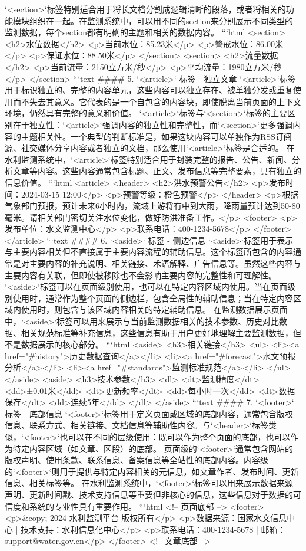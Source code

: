 `<section>`标签特别适合用于将长文档分割成逻辑清晰的段落，或者将相关的功能模块组织在一起。在监测系统中，可以用不同的section来分别展示不同类型的监测数据，每个section都有明确的主题和相关的数据内容。 ```html <section> <h2>水位数据</h2> <p>当前水位：85.23米</p> <p>警戒水位：86.00米</p> <p>保证水位：88.50米</p> </section> <section> <h2>流量数据</h2> <p>当前流量：2150立方米/秒</p> <p>平均流量：1980立方米/秒</p> </section> ```text #### 5. `<article>` 标签 - 独立文章 `<article>`标签用于标识独立的、完整的内容单元，这些内容可以独立存在、被单独分发或重复使用而不失去其意义。它代表的是一个自包含的内容块，即使脱离当前页面的上下文环境，仍然具有完整的意义和价值。 `<article>`标签与`<section>`标签的主要区别在于独立性：`<article>`强调内容的独立性和完整性，而`<section>`更多强调内容的主题相关性。一个典型的判断标准是，如果这块内容可以单独作为RSS订阅源、社交媒体分享内容或者独立的文档，那么使用`<article>`标签是合适的。 在水利监测系统中，`<article>`标签特别适合用于封装完整的报告、公告、新闻、分析文章等内容。这些内容通常包含标题、正文、发布信息等完整要素，具有独立的信息价值。 ```html <article> <header> <h2>洪水预警公告</h2> <p>发布时间：2024-03-15 12:00</p> <p>预警等级：橙色预警</p> </header> <p>根据气象部门预报，预计未来6小时内，流域上游将有中到大雨，降雨量预计达到50-80毫米。请相关部门密切关注水位变化，做好防洪准备工作。</p> <footer> <p>发布单位：水文监测中心</p> <p>联系电话：400-1234-5678</p> </footer> </article> ```text #### 6. `<aside>` 标签 - 侧边信息 `<aside>`标签用于表示与主要内容相关但不直接属于主要内容流程的辅助信息。这个标签所包含的内容通常是对主要内容的补充说明、相关链接、术语解释、广告信息等。虽然这些内容与主要内容有关联，但即使被移除也不会影响主要内容的完整性和可理解性。 `<aside>`标签可以在页面级别使用，也可以在特定内容区域内使用。当在页面级别使用时，通常作为整个页面的侧边栏，包含全局性的辅助信息；当在特定内容区域内使用时，则包含与该区域内容相关的特定辅助信息。 在监测数据展示页面中，`<aside>`标签可以用来展示与当前监测数据相关的技术参数、历史对比数据、相关规范标准等补充信息，这些信息有助于用户更好地理解主要监测数据，但不是数据展示的核心部分。 ```html <aside> <h3>相关链接</h3> <ul> <li><a href="#history">历史数据查询</a></li> <li><a href="#forecast">水文预报分析</a></li> <li><a href="#standards">监测标准规范</a></li> </ul> </aside> <aside> <h3>技术参数</h3> <dl> <dt>监测精度</dt> <dd>±0.01米</dd> <dt>更新频率</dt> <dd>每小时一次</dd> <dt>数据保存</dt> <dd>连续5年</dd> </dl> </aside> ```text #### 7. `<footer>` 标签 - 底部信息 `<footer>`标签用于定义页面或区域的底部内容，通常包含版权信息、联系方式、相关链接、文档信息等辅助性内容。与`<header>`标签类似，`<footer>`也可以在不同的层级使用：既可以作为整个页面的底部，也可以作为特定内容区域（如文章、区段）的底部。 页面级的`<footer>`通常包含网站的版权声明、使用条款、联系信息、备案信息等全站性的底部内容。内容级的`<footer>`则用于提供与特定内容相关的元信息，如文章作者、发布时间、更新信息、相关标签等。 在水利监测系统中，`<footer>`标签可以用来展示数据来源声明、更新时间戳、技术支持信息等重要但非核心的信息，这些信息对于数据的可信度和系统的专业性具有重要作用。 ```html <!-- 页面底部 --> <footer> <p>&copy; 2024 水利监测平台 版权所有</p> <p>数据来源：国家水文信息中心 | 技术支持：水利信息化中心</p> <p>联系电话：400-1234-5678 | 邮箱：support@water.gov.cn</p> </footer> <!-- 文章底部 --> 